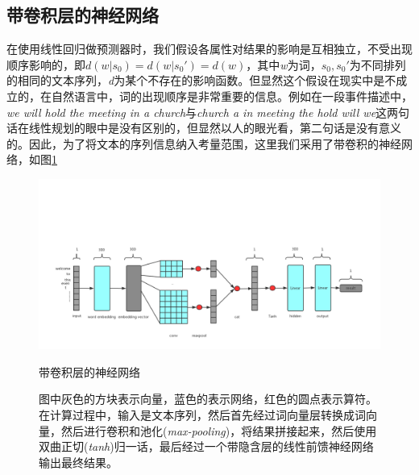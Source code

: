 \documentclass[12pt]{template}
\begin{document}
\subsection{带卷积层的神经网络}
在使用线性回归做预测器时，我们假设各属性对结果的影响是互相独立，不受出现顺序影响的，即\(d(w|s_0)=d(w|s_0')=d(w)\)，其中\textit{w}为词，\(s_0,s_0'\)为不同排列的相同的文本序列，\textit{d}为某个不存在的影响函数。但显然这个假设在现实中是不成立的，在自然语言中，词的出现顺序是非常重要的信息。例如在一段事件描述中，\textit{we will hold the meeting in a church}与\textit{church a in meeting the hold will we}这两句话在线性规划的眼中是没有区别的，但显然以人的眼光看，第二句话是没有意义的。因此，为了将文本的序列信息纳入考量范围，这里我们采用了带卷积的神经网络，如图\ref{f21}
\begin{figure}[htbp]
    \centering
    \includegraphics[width=16cm]{conv_ranker.png}
    \caption{带卷积层的神经网络}
    \captionsetup{font=small,margin=30pt}\caption*{图中灰色的方块表示向量，蓝色的表示网络，红色的圆点表示算符。在计算过程中，输入是文本序列，然后首先经过词向量层转换成词向量，然后进行卷积和池化(\textit{max-pooling})，将结果拼接起来，然后使用双曲正切(\textit{tanh})归一话，最后经过一个带隐含层的线性前馈神经网络输出最终结果。}
    \label{f21}
\end{figure}
\end{document}
